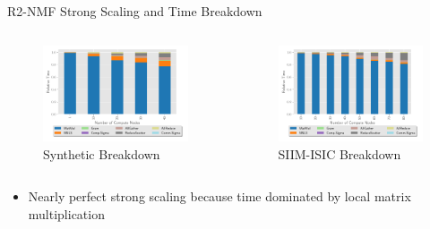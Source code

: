 \documentclass{beamer}
\newcommand{\image}{SIIM-ISIC}
\begin{document}
\begin{frame}{R2-NMF Strong Scaling and Time Breakdown}
\begin{columns}
    \end{columns}
\vspace{-.5cm}
    \begin{columns}
        \begin{column}{0.5\textwidth}
            \begin{figure}
            \includegraphics[width=\figscal]{../plots/synthetic_rank2_strongscaling.pdf}
            \caption{Synthetic Breakdown}
            \end{figure}
        \end{column}
        \begin{column}{0.5\textwidth}
            \begin{figure}
            \includegraphics[width=\figscal]{../plots/realworld_rank2_strongscaling.pdf}
            \caption{\image{} Breakdown}
            \end{figure}
        \end{column}
    \end{columns}
    
\begin{itemize}
\small
    \item Nearly perfect strong scaling because time dominated by local matrix multiplication
\end{itemize}
    
\end{frame}
\end{document}
